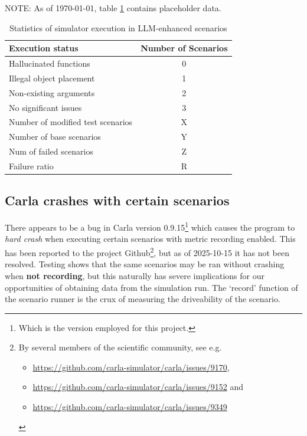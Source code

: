 \begin{tcolorbox}[colback=red!5!white, colframe=red!80!black, title=WIP warning]
    NOTE: As of \today, table \ref{tab:scenarioFailures} contains placeholder data.
\end{tcolorbox}

\begin{table}[htbp]
    \centering
    \caption{Statistics of simulator execution in LLM-enhanced scenarios}
    \begin{tabular}{l c}
        \toprule
        Execution status                  & Number of Scenarios \\
        \midrule
        Hallucinated functions            & 0                   \\
        Illegal object placement          & 1                   \\
        Non-existing arguments            & 2                   \\
        No significant issues             & 3                   \\
        \midrule
        Number of modified test scenarios & X                   \\
        Number of base scenarios          & Y                   \\
        Num of failed scenarios           & Z                   \\ %
        Failure ratio                     & R                   \\ %
        \bottomrule
    \end{tabular}
    \label{tab:scenarioFailures}
\end{table}


\subsection{Carla crashes with certain scenarios}

There appears to be a bug in Carla version 0.9.15\footnote{Which is the version
    employed for this project.} which causes the program to \emph{hard crash} when
executing certain scenarios with metric recording enabled. This has been
reported to the project Github\footnote{By several members of the scientific community, see e.g.
    \begin{itemize}\item  \url{https://github.com/carla-simulator/carla/issues/9170}, \item
              \url{https://github.com/carla-simulator/carla/issues/9152} and \item
              \url{https://github.com/carla-simulator/carla/issues/9349}\end{itemize}}, but as of 2025-10-15
it has not been resolved. Testing shows that the same scenarios may be ran without crashing when
\textbf{not recording}, but this naturally has severe implications for our
opportunities of obtaining data from the simulation run. The `record' function
of the scenario runner is the crux of measuring the driveability of the
scenario.


